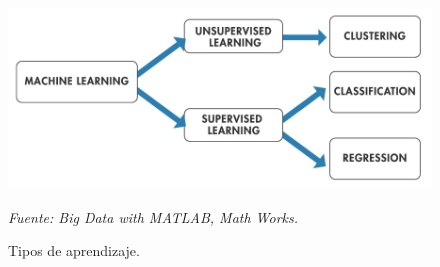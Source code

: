 \begin{figure}[H]
		\centering
		\includegraphics[width=130mm]{Imagenes/aprendizaje_tipos.jpg}
		\caption{Tipos de aprendizaje.}
		\vspace{0.15cm}
		\textit{Fuente: Big Data with MATLAB, Math Works.}
		\label{fig:aprendizajes}
\end{figure}

